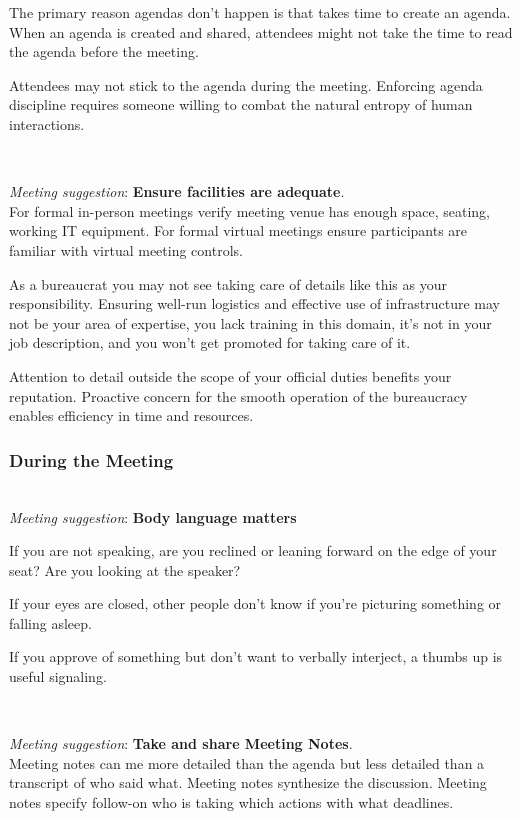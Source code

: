 The primary reason agendas don't happen is that takes time to create an agenda. When an agenda is created and shared, attendees might not take the time to read the agenda before the meeting. 

Attendees may not stick to the agenda during the meeting. Enforcing agenda discipline requires someone willing to combat the natural entropy of human interactions. 



\ \\
\begin{samepage}
\textit{Meeting suggestion}: \textbf{Ensure facilities are adequate}.\\
For formal in-person meetings verify meeting venue has enough space, seating, working IT equipment. For formal virtual meetings ensure participants are familiar with virtual meeting controls. 
\end{samepage}

As a bureaucrat you may not see taking care of details like this as your responsibility. Ensuring well-run logistics and effective use of infrastructure may not be your area of expertise, you lack training in this domain, it's not in your job description, and you won't get promoted for taking care of it. 

Attention to detail outside the scope of your official duties benefits your reputation. Proactive concern for the smooth operation of the bureaucracy enables efficiency in time and resources.



\subsubsection*{During the Meeting}

\ \\
\textit{Meeting suggestion}: \textbf{Body language matters}

If you are not speaking, are you reclined or leaning forward on the edge of your seat? Are you looking at the speaker?

If your eyes are closed, other people don't know if you're picturing something or falling asleep. 

If you approve of something but don't want to verbally interject, a thumbs up is useful signaling. 

\ \\
\begin{samepage}
\textit{Meeting suggestion}: \textbf{Take and share Meeting Notes}.\\
Meeting notes can me more detailed than the agenda but less detailed than a transcript of who said what. Meeting notes synthesize the discussion. Meeting notes specify follow-on who is taking which actions with what deadlines. 
\end{samepage}

